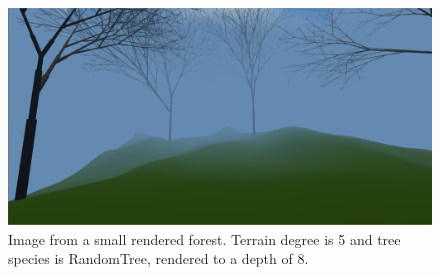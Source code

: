 \documentclass{article}
\begin{document}
\begin{figure}[p!]
    \centering
    \includegraphics[height=0.7\textwidth, angle=90, keepaspectratio=true]{fig/scene3}
    \caption[Scene]{Image from a small rendered forest. Terrain degree is 5 and
tree species is RandomTree, rendered to a depth of 8.}
    \label{fig:fig/scene}

\end{figure}

    \pagebreak
    \pagebreak
    
\end{document}
